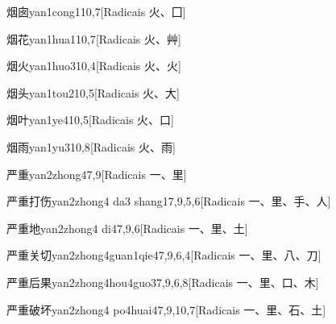 \begin{entry}{烟囱}{yan1cong1}{10,7}[Radicais ⽕、⼞]
\end{entry}

\begin{entry}{烟花}{yan1hua1}{10,7}[Radicais ⽕、⾋]
\end{entry}

\begin{entry}{烟火}{yan1huo3}{10,4}[Radicais ⽕、⽕]
\end{entry}

\begin{entry}{烟头}{yan1tou2}{10,5}[Radicais ⽕、⼤]
\end{entry}

\begin{entry}{烟叶}{yan1ye4}{10,5}[Radicais ⽕、⼝]
\end{entry}

\begin{entry}{烟雨}{yan1yu3}{10,8}[Radicais ⽕、⾬]
\end{entry}

\begin{entry}{严重}{yan2zhong4}{7,9}[Radicais ⼀、⾥]
\end{entry}

\begin{entry}{严重打伤}{yan2zhong4 da3 shang1}{7,9,5,6}[Radicais ⼀、⾥、⼿、⼈]
\end{entry}

\begin{entry}{严重地}{yan2zhong4 di4}{7,9,6}[Radicais ⼀、⾥、⼟]
\end{entry}

\begin{entry}{严重关切}{yan2zhong4guan1qie4}{7,9,6,4}[Radicais ⼀、⾥、⼋、⼑]
\end{entry}

\begin{entry}{严重后果}{yan2zhong4hou4guo3}{7,9,6,8}[Radicais ⼀、⾥、⼝、⽊]
\end{entry}

\begin{entry}{严重破坏}{yan2zhong4 po4huai4}{7,9,10,7}[Radicais ⼀、⾥、⽯、⼟]
\end{entry}

